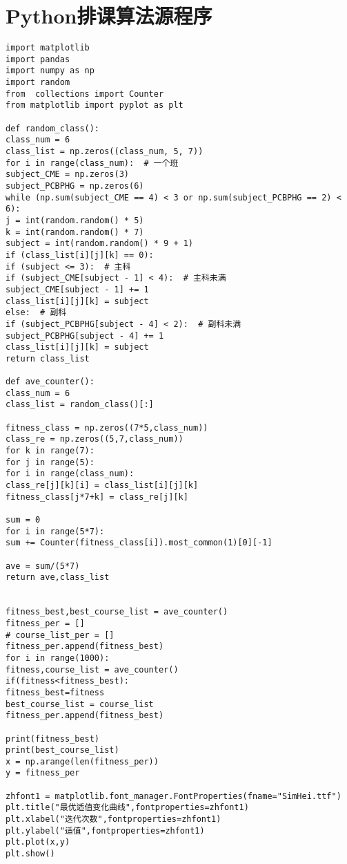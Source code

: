 \documentclass[bwprint]{cumcmthesis}
\begin{document}
\section{Python排课算法源程序}
\lstset{language=Python}
\begin{lstlisting}
import matplotlib
import pandas
import numpy as np
import random
from  collections import Counter
from matplotlib import pyplot as plt

def random_class():
class_num = 6
class_list = np.zeros((class_num, 5, 7))
for i in range(class_num):  # 一个班
subject_CME = np.zeros(3)
subject_PCBPHG = np.zeros(6)
while (np.sum(subject_CME == 4) < 3 or np.sum(subject_PCBPHG == 2) < 6):
j = int(random.random() * 5)
k = int(random.random() * 7)
subject = int(random.random() * 9 + 1)
if (class_list[i][j][k] == 0):
if (subject <= 3):  # 主科
if (subject_CME[subject - 1] < 4):  # 主科未满
subject_CME[subject - 1] += 1
class_list[i][j][k] = subject
else:  # 副科
if (subject_PCBPHG[subject - 4] < 2):  # 副科未满
subject_PCBPHG[subject - 4] += 1
class_list[i][j][k] = subject
return class_list

def ave_counter():
class_num = 6
class_list = random_class()[:]

fitness_class = np.zeros((7*5,class_num))
class_re = np.zeros((5,7,class_num))
for k in range(7):
for j in range(5):
for i in range(class_num):
class_re[j][k][i] = class_list[i][j][k]
fitness_class[j*7+k] = class_re[j][k]

sum = 0
for i in range(5*7):
sum += Counter(fitness_class[i]).most_common(1)[0][-1]

ave = sum/(5*7)
return ave,class_list


fitness_best,best_course_list = ave_counter()
fitness_per = []
# course_list_per = []
fitness_per.append(fitness_best)
for i in range(1000):
fitness,course_list = ave_counter()
if(fitness<fitness_best):
fitness_best=fitness
best_course_list = course_list
fitness_per.append(fitness_best)

print(fitness_best)
print(best_course_list)
x = np.arange(len(fitness_per))
y = fitness_per

zhfont1 = matplotlib.font_manager.FontProperties(fname="SimHei.ttf") 
plt.title("最优适值变化曲线",fontproperties=zhfont1)
plt.xlabel("迭代次数",fontproperties=zhfont1)
plt.ylabel("适值",fontproperties=zhfont1)
plt.plot(x,y)
plt.show()
\end{lstlisting}
\end{document}
